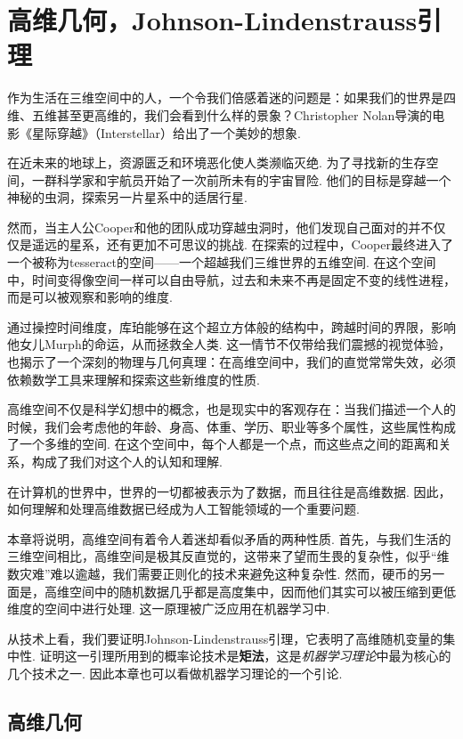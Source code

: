  \chapter{高维几何，Johnson-Lindenstrauss引理}\label{chap:J-L-Lemma}

作为生活在三维空间中的人，一个令我们倍感着迷的问题是：如果我们的世界是四维、五维甚至更高维的，我们会看到什么样的景象？Christopher Nolan导演的电影《星际穿越》（Interstellar）给出了一个美妙的想象. 

在近未来的地球上，资源匮乏和环境恶化使人类濒临灭绝. 为了寻找新的生存空间，一群科学家和宇航员开始了一次前所未有的宇宙冒险. 他们的目标是穿越一个神秘的虫洞，探索另一片星系中的适居行星. 

然而，当主人公Cooper和他的团队成功穿越虫洞时，他们发现自己面对的并不仅仅是遥远的星系，还有更加不可思议的挑战. 在探索的过程中，Cooper最终进入了一个被称为tesseract的空间——一个超越我们三维世界的五维空间. 在这个空间中，时间变得像空间一样可以自由导航，过去和未来不再是固定不变的线性进程，而是可以被观察和影响的维度. 

通过操控时间维度，库珀能够在这个超立方体般的结构中，跨越时间的界限，影响他女儿Murph的命运，从而拯救全人类. 这一情节不仅带给我们震撼的视觉体验，也揭示了一个深刻的物理与几何真理：在高维空间中，我们的直觉常常失效，必须依赖数学工具来理解和探索这些新维度的性质. 

高维空间不仅是科学幻想中的概念，也是现实中的客观存在：当我们描述一个人的时候，我们会考虑他的年龄、身高、体重、学历、职业等多个属性，这些属性构成了一个多维的空间. 在这个空间中，每个人都是一个点，而这些点之间的距离和关系，构成了我们对这个人的认知和理解. 

在计算机的世界中，世界的一切都被表示为了数据，而且往往是高维数据. 因此，如何理解和处理高维数据已经成为人工智能领域的一个重要问题. 

本章将说明，高维空间有着令人着迷却看似矛盾的两种性质. 首先，与我们生活的三维空间相比，高维空间是极其反直觉的，这带来了望而生畏的复杂性，似乎“维数灾难”难以逾越，我们需要正则化的技术来避免这种复杂性. 然而，硬币的另一面是，高维空间中的随机数据几乎都是高度集中，因而他们其实可以被压缩到更低维度的空间中进行处理. 这一原理被广泛应用在机器学习中. 

从技术上看，我们要证明Johnson-Lindenstrauss引理，它表明了高维随机变量的集中性. 证明这一引理所用到的概率论技术是\textbf{矩法}，这是\textit{机器学习理论}中最为核心的几个技术之一. 因此本章也可以看做机器学习理论的一个引论. 

\section{高维几何} \label{sec:high-dimensional-geometry}

